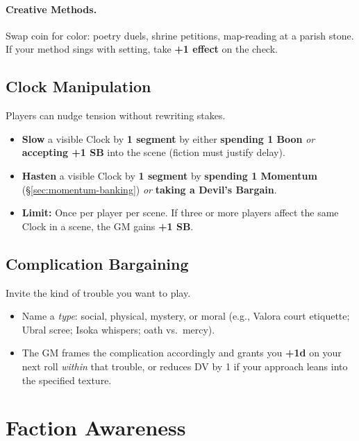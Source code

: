 \paragraph{Creative Methods.}
Swap coin for color: poetry duels, shrine petitions, map-reading at a parish stone. If your method sings with setting, take \textbf{+1 effect} on the check.%

\subsection{Clock Manipulation}
\label{sec:clock-manip}

Players can nudge tension without rewriting stakes.
\begin{itemize}
  \item \textbf{Slow} a visible Clock by \textbf{1 segment} by either \textbf{spending 1 Boon} \emph{or} \textbf{accepting +1 SB} into the scene (fiction must justify delay).
  \item \textbf{Hasten} a visible Clock by \textbf{1 segment} by \textbf{spending 1 Momentum} (\S\ref{sec:momentum-banking}) \emph{or} \textbf{taking a Devil's Bargain}. 
  \item \textbf{Limit:} Once per player per scene. If three or more players affect the same Clock in a scene, the GM gains \textbf{+1 SB}.
\end{itemize}

\subsection{Complication Bargaining}

Invite the kind of trouble you want to play.
\begin{itemize}
  \item Name a \emph{type}: social, physical, mystery, or moral (e.g., Valora court etiquette; Ubral scree; Isoka whispers; oath vs.\ mercy).
  \item The GM frames the complication accordingly and grants you \textbf{+1d} on your next roll \emph{within} that trouble, or reduces DV by 1 if your approach leans into the specified texture.
\end{itemize}

\section{Faction Awareness}

